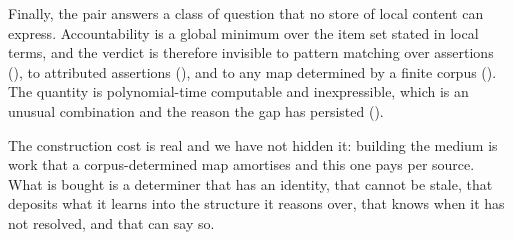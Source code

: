 \documentclass[11pt,twocolumn,a4paper]{article}
\theoremstyle{dirthm}
\theoremstyle{definition}
\theoremstyle{remark}
\begin{document}
Finally, the pair answers a class of question that no store of local content
can express. Accountability is a global minimum over the item set stated in
local terms, and the verdict is therefore invisible to pattern matching over
assertions (), to attributed assertions
(), and to any map determined by a finite corpus
(). The quantity is polynomial-time computable and
inexpressible, which is an unusual combination and the reason the gap has
persisted ().

The construction cost is real and we have not hidden it: building the medium is
work that a corpus-determined map amortises and this one pays per source. What
is bought is a determiner that has an identity, that cannot be stale, that
deposits what it learns into the structure it reasons over, that knows when it
has not resolved, and that can say so.



\end{document}
